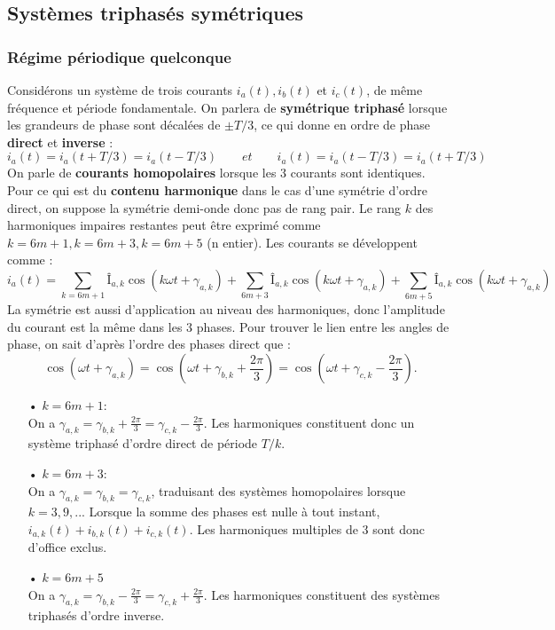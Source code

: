 	\subsection{Systèmes triphasés symétriques}
		\subsubsection{Régime périodique quelconque}
			Considérons un système de trois courants $i_a(t), i_b(t)$ et $i_c(t)$, de même fréquence et période fondamentale. On parlera de \textbf{symétrique triphasé} lorsque les grandeurs de phase sont décalées de $\pm T/3$, ce qui donne en ordre de phase \textbf{direct} et \textbf{inverse} :
			\begin{equation}
				i_a(t) = i_a(t+T/3) = i_a(t-T/3) \qquad et \qquad i_a(t) = i_a(t-T/3) = i_a(t+T/3)
			\end{equation}
			On parle de \textbf{courants homopolaires} lorsque les 3 courants sont identiques. Pour ce qui est du \textbf{contenu harmonique} dans le cas d'une symétrie d'ordre direct, on suppose la symétrie demi-onde donc pas de rang pair. Le rang $k$ des harmoniques impaires restantes peut être exprimé comme $k = 6m+1, k = 6m +3, k= 6m+5$ (n entier). Les courants se développent comme : 
			\begin{equation}
				i_a(t) = \sum _{k = 6m+1}Î_{a,k} \cos (k\omega t + \gamma _{a,k})+ \sum _{6m+3}Î_{a,k} \cos (k\omega t + \gamma _{a,k}) + \sum _{6m+5}Î_{a,k} \cos (k\omega t + \gamma _{a,k})
			\end{equation}
			La symétrie est aussi d'application au niveau des harmoniques, donc l'amplitude du courant est la même dans les 3 phases. Pour trouver le lien entre les angles de phase, on sait d'après l'ordre des phases direct que :
			\begin{equation}
				\cos (\omega t + \gamma _{a,k}) = \cos (\omega t + \gamma _{b,k} + \frac{2\pi}{3}) = \cos (\omega t + \gamma _{c,k} - \frac{2\pi}{3}). 
			\end{equation}
			\begin{itemize}
				\item[•] $k = 6m+1 :$\\
				On a $\gamma _{a,k} = \gamma _{b,k} + \frac{2\pi}{3} = \gamma _{c,k} - \frac{2\pi}{3}$. Les harmoniques constituent donc un système triphasé d'ordre direct de période $T/k$. 
				\item[•] $ k = 6m+3 :$\\
				On a $\gamma _{a,k} = \gamma _{b,k} = \gamma _{c,k}$, traduisant des systèmes homopolaires lorsque $k = 3, 9, ...$ Lorsque la somme des phases est nulle à tout instant, $i_{a,k}(t)+i_{b,k}(t)+i_{c,k}(t)$. Les harmoniques multiples de 3 sont donc d'office exclus. 
				\item[•] $k = 6m+5$\\
				 On a $\gamma _{a,k} = \gamma _{b,k} -\frac{2\pi}{3} =\gamma _{c,k}+\frac{2\pi}{3}$. Les harmoniques constituent des systèmes triphasés d'ordre inverse. 
				 \newpage
			\end{itemize}
			
